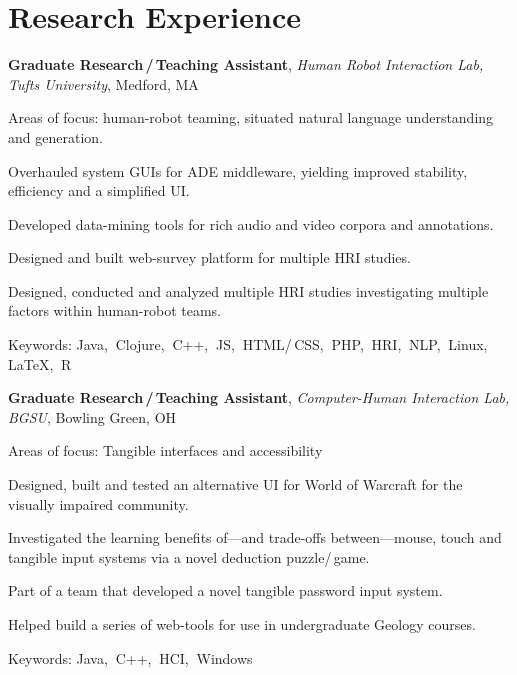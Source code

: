 \documentclass[10pt, letter]{article}
\newcommand{\years}[1]{\marginnote{\footnotesize #1}}
\newenvironment{desc*}{
  \begin{description}
    \setlength{\itemsep}{0.2pt}
    \setlength{\parskip}{-1pt}
    \setlength{\parsep}{0pt}
  }{
  \end{description}
}
\begin{document}
\section*{Research Experience}
\years{2012 - 2014} 
\textbf{Graduate Research\,/\,Teaching Assistant}, 
\textit{Human Robot Interaction Lab, Tufts University}, Medford, MA\bigskip

Areas of focus: human-robot teaming, situated natural language understanding and generation. 
\begin{itemize}[leftmargin=*, parsep=1pt, rightmargin=1.5cm]
  {\light
\item Overhauled system GUIs for ADE middleware, yielding improved
  stability, efficiency and a simplified UI. 
\item Developed data-mining tools for rich audio and video corpora and annotations. 
\item Designed and built web-survey platform for multiple HRI studies. 
\item Designed, conducted and analyzed multiple HRI studies
  investigating multiple factors within human-robot teams.
  }
\end{itemize}
\begin{desc*}
\item[\rm \color{redblue} Keywords:] Java,$\:$ Clojure,$\:$ C++,$\:$
  JS,$\:$ HTML/\,CSS,$\:$ PHP,$\:$ HRI,$\:$ NLP,$\:$ Linux,$\:$ \LaTeX,$\:$ R\bigbreak
\end{desc*}

\years{2010 - 2012}
\textbf{Graduate Research\,/\,Teaching Assistant}, 
\textit{Computer-Human Interaction Lab, BGSU}, Bowling Green, OH \bigskip

Areas of focus: Tangible interfaces and accessibility
\begin{itemize}[leftmargin=*, parsep=1pt, rightmargin=1.5cm]
  {\light
\item Designed, built and tested an alternative UI for World of Warcraft for
  the visually impaired community. 
\item Investigated the learning benefits of---and trade-offs between---mouse,
  touch and tangible input systems via a novel deduction puzzle/\,game.
\item Part of a team that developed a novel tangible password input system.
\item Helped build a series of web-tools for use in undergraduate Geology courses.
  }
\end{itemize}
\begin{desc*}
\item[\rm \color{redblue} Keywords:] Java,$\:$ C++,$\:$ HCI,$\:$ Windows\\
\end{desc*}
\end{document}

